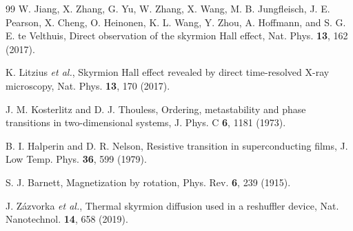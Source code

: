 \documentclass[aps,prb,twocolumn,superscriptaddress,longbibliography,floatfix]{revtex4-2}
\begin{document}
\begin{thebibliography}{99}
 W. Jiang, X. Zhang, G. Yu, W. Zhang, X. Wang, M. B. Jungfleisch, J. E. Pearson, X. Cheng, O. Heinonen, K. L. Wang, Y. Zhou, A. Hoffmann, and S. G. E. te Velthuis, Direct observation of the skyrmion Hall effect, Nat. Phys. \textbf{13}, 162 (2017).

 K. Litzius \emph{et al.}, Skyrmion Hall effect revealed by direct time-resolved X-ray microscopy, Nat. Phys. \textbf{13}, 170 (2017).

 J. M. Kosterlitz and D. J. Thouless, Ordering, metastability and phase transitions in two-dimensional systems, J. Phys. C \textbf{6}, 1181 (1973).

 B. I. Halperin and D. R. Nelson, Resistive transition in superconducting films, J. Low Temp. Phys. \textbf{36}, 599 (1979).

 S. J. Barnett, Magnetization by rotation, Phys. Rev. \textbf{6}, 239 (1915).

 J. Z\'azvorka \emph{et al.}, Thermal skyrmion diffusion used in a reshuffler device, Nat. Nanotechnol. \textbf{14}, 658 (2019).

\end{thebibliography}
\end{document}
